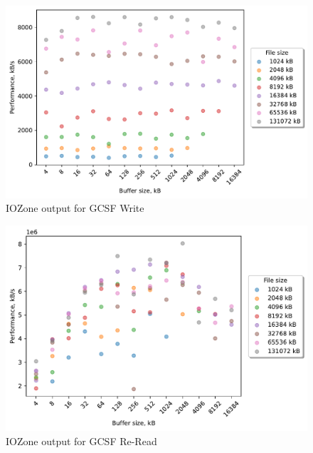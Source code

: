 \begin{figure}[!htb]
	\label{fig:bench_gcsf_write}
	\begin{center}
		\includegraphics[width=1.0\textwidth]{figures.nosync/benchmarking/gcsf/Write.pdf}
	\end{center}
	\caption{IOZone output for GCSF Write}
\end{figure}

\begin{figure}[!htb]
	\label{fig:bench_gcsf_re_read}
	\begin{center}
		\includegraphics[width=1.0\textwidth]{figures.nosync/benchmarking/gcsf/Re-Read.pdf}
	\end{center}
	\caption{IOZone output for GCSF \mbox{Re-Read}}
\end{figure}

